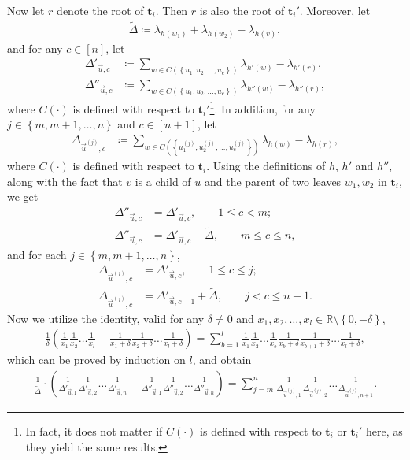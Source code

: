 \documentclass[superscriptaddress,onecolumn,nofootinbib,longbibliography,a4paper,accepted=2026-09-29]{quantumarticle}
\theoremstyle{plain}
\theoremstyle{definition}
\numberwithin{thm}{section}
\numberwithin{assumption}{section}
\numberwithin{lemma}{section}
\numberwithin{prop}{section}
\numberwithin{cor}{section}
\numberwithin{definition}{section}
\numberwithin{rmk}{section}
\numberwithin{equation}{section}
\newcommand{\R}{\mathbb{R}}
\newcommand{\lrb}[1]{\left ( #1 \right )}
\newcommand{\lrcb}[1]{\left \{ #1 \right \}}
\newcommand{\defeq}{\coloneqq}
\newcommand{\mbt}{\mathbf{t}}
\begin{document}
\begin{itemize}
Now let $r$ denote the root of $\mbt_i$. Then $r$ is also the root of $\mbt_i'$. Moreover, let 
\begin{align}
\tilde{\Delta} \defeq \lambda_{h(w_1)}+\lambda_{h(w_2)}-\lambda_{h(v)}, 
\end{align}
and for any $c \in [n]$, let 
\begin{align}
\Delta'_{\vec u, c} &\defeq \sum_{w \in C(\lrcb{u_1,u_2,\dots,u_c})} \lambda_{h'(w)} -\lambda_{h'(r)},    \\
\Delta''_{\vec u, c} &\defeq \sum_{w \in C(\lrcb{u_1,u_2,\dots,u_c})} \lambda_{h''(w)} -\lambda_{h''(r)}, 
\end{align}
where $C(\cdot)$ is defined with respect to $\mbt_i'$\footnote{In fact, it does not matter if $C(\cdot)$ is defined with respect to $\mbt_i$ or $\mbt_i'$ here, as they yield the same results.}. In addition, for any $j \in \lrcb{m, m+1, \dots, n}$ and $c \in [n+1]$, let
\begin{align}
\Delta_{\vec u^{(j)}, c} &\defeq \sum_{w \in C\lrb{\lrcb{u^{(j)}_1,u^{(j)}_2,\dots,u^{(j)}_c}}} \lambda_{h(w)} -\lambda_{h(r)},
\end{align}
where $C(\cdot)$ is defined with respect to $\mbt_i$. Using the definitions of $h$, $h'$ and $h''$, along with the fact that $v$ is a child of $u$ and the parent of two leaves $w_1, w_2$ in $\mbt_i$, we get
\begin{align}
    \Delta''_{\vec u, c}&=\Delta'_{\vec u, c}, \qquad 1 \le c <m; \\
    \Delta''_{\vec u, c}&=\Delta'_{\vec u, c}+\tilde{\Delta}, \qquad m \le c \le n, 
\end{align}
and for each $j \in \lrcb{m, m+1, \dots, n}$, 
\begin{align}
\Delta_{\vec u^{(j)}, c} &=\Delta'_{\vec u, c}, \qquad 1 \le c \le j;\\    
\Delta_{\vec u^{(j)}, c} &=\Delta'_{\vec u, c-1}+\tilde{\Delta}, \qquad j < c \le n+1.
\end{align}
Now we utilize the identity, valid for any $\delta \neq 0$ and $x_1, x_2, \dots, x_l \in \R \setminus \lrcb{0, -\delta}$, 
\begin{align}
\frac{1}{\delta}\lrb{
\frac{1}{x_1}    
\frac{1}{x_2}
\dots
\frac{1}{x_l}
-
\frac{1}{x_1+\delta}    
\frac{1}{x_2+\delta}
\dots
\frac{1}{x_l+\delta}
}
=\sum_{b=1}^{l}
\frac{1}{x_1}    
\frac{1}{x_2}
\dots
\frac{1}{x_b}
\frac{1}{x_b+\delta}
\frac{1}{x_{b+1}+\delta}
\dots
\frac{1}{x_{l}+\delta},
\end{align}
which can be proved by induction on $l$, and obtain
\begin{align}
\frac{1}{\tilde{\Delta}} \cdot \lrb{
\frac{1}{\Delta'_{\vec u, 1}}
\frac{1}{\Delta'_{\vec u, 2}} \dots
\frac{1}{\Delta'_{\vec u, n}} 
-
\frac{1}{\Delta''_{\vec u, 1}}
\frac{1}{\Delta''_{\vec u, 2}} \dots
\frac{1}{\Delta''_{\vec u, n}} }
=\sum_{j=m}^n 
\frac{1}{\Delta_{\vec u^{(j)}, 1}}
\frac{1}{\Delta_{\vec u^{(j)}, 2}}\dots 
\frac{1}{\Delta_{\vec u^{(j)}, n+1}}.
\end{align}


\end{itemize}
\end{document}
